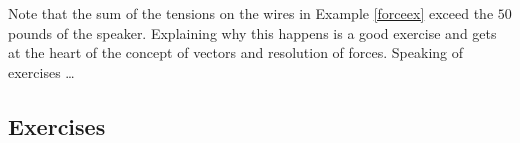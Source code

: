 Note that the sum of the tensions on the wires in Example \ref{forceex} exceed the $50$ pounds of the speaker.  Explaining why this happens is a good exercise and gets at the heart of the concept of vectors and resolution of forces.  Speaking of exercises \ldots


\newpage

\subsection{Exercises}



\closegraphsfile
